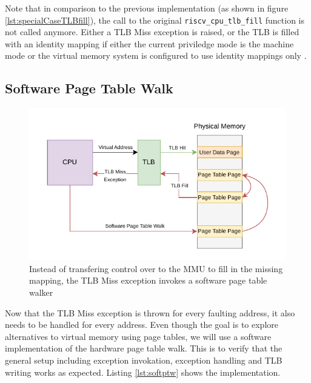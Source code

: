 Note that in comparison to the previous implementation (as shown in figure \ref{lst:specialCaseTLBfill}), the
call to the original \texttt{riscv\_cpu\_tlb\_fill} function is not called anymore.
Either a TLB Miss exception is raised, or the TLB is filled with an identity mapping if either the current
priviledge mode is the machine mode or the virtual memory system is configured to use identity mappings only
\cite{RISCVInstructionSet}.


\subsection{Software Page Table Walk}


\begin{figure}[ht!]
    \centering
    \includegraphics[scale=1.5]{figures/theory_sw_ptw.pdf}
    \caption[Software Page Table Walker]{Instead of transfering control over to the MMU to fill in the missing mapping,
        the TLB Miss exception invokes a software page table walker}
    \label{fig:theory:sw_ptw}
\end{figure}

Now that the TLB Miss exception is thrown for every faulting address, it also needs to be handled
for every address.
Even though the goal is to explore alternatives to virtual memory using page tables, we will
use a software implementation of the hardware page table walk. This is to verify that the
general setup including exception invokation, exception handling and TLB writing works as
expected.
Listing \ref{lst:softptw} shows the implementation.


